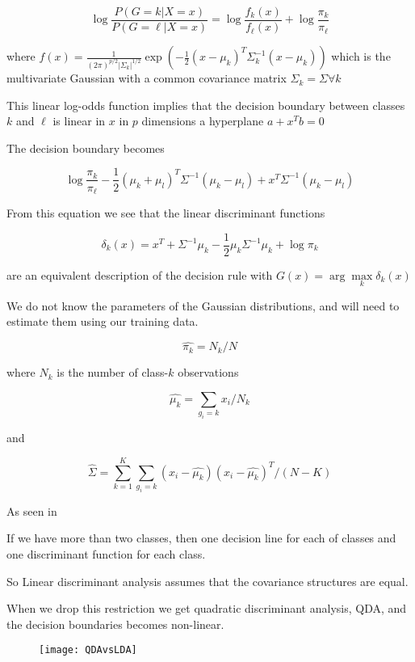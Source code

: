 \[
    \log \frac{P(G = k | X = x)}{P(G = \ell | X = x)} = \log \frac{f_k(x)}{f_\ell (x)} + \log \frac{\pi_k}{\pi_\ell}
\]

where $f(x) = \frac{1}{(2 \pi)^{p/2} |\Sigma_k|^{1/2}} \exp(-\frac{1}{2} (x - \mu_k)^T \Sigma^{-1}_k (x - \mu_k))$ which is the multivariate Gaussian with a common covariance matrix $\Sigma_k = \Sigma \forall k$

This linear log-odds function implies that the decision boundary between classes $k$ and $\ell$ is linear in $x$ in $p$ dimensions a hyperplane $a + x^T b = 0$

The decision boundary becomes

\[
    \log \frac{\pi_k}{\pi_\ell} - \frac{1}{2} (\mu_k + \mu_l)^T \Sigma^{-1} (\mu_k - \mu_l) + x^T \Sigma^{-1}(\mu_k - \mu_l)
\]

From this equation we see that the linear discriminant functions

\[
    \delta_k(x) = x^T + \Sigma^{-1} \mu_k - \frac{1}{2} \mu_k \Sigma^{-1} \mu_k + \log \pi_k
\]

are an equivalent description of the decision rule with $G(x) = \arg \max\limits_k \delta_k (x)$

We do not know the parameters of the Gaussian distributions, and will need to estimate them using our training data.

\[
    \hat{\pi_k} = N_k / N
\]

where $N_k$ is the number of class-$k$ observations

\[
    \hat{\mu_k} = \sum_{g_i = k} x_i / N_k
\]

and

\[
    \hat{\Sigma} = \sum_{k=1}^{K}\sum_{g_i = k} (x_i - \hat{\mu_k})(x_i - \hat{\mu_k})^T / (N - K)
\]

As seen in \cite[p.~110]{friedman2016elements}

If we have more than two classes, then one decision line for each of classes and one discriminant function for each class.

So Linear discriminant analysis assumes that the covariance structures are equal.

When we drop this restriction we get quadratic discriminant
analysis, QDA, and the decision boundaries becomes non-linear.

\begin{figure}[H]
  \centering
  \texttt{[image: QDAvsLDA]}
\end{figure}

